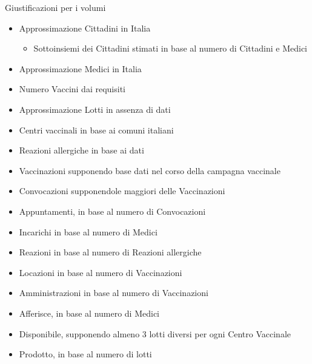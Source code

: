 \documentclass[11pt]{article}
\begin{document}
Giustificazioni per i volumi
\begin{itemize}
\item Approssimazione Cittadini in Italia
\begin{itemize}
\item Sottoinsiemi dei Cittadini stimati in base al numero di Cittadini e Medici
\end{itemize}
\item Approssimazione Medici in Italia
\item Numero Vaccini dai requisiti
\item Approssimazione Lotti in assenza di dati
\item Centri vaccinali in base ai comuni italiani
\item Reazioni allergiche in base ai dati
\item Vaccinazioni supponendo base dati nel corso della campagna vaccinale
\item Convocazioni supponendole maggiori delle Vaccinazioni
\item Appuntamenti, in base al numero di Convocazioni
\item Incarichi in base al numero di Medici
\item Reazioni in base al numero di Reazioni allergiche
\item Locazioni in base al numero di Vaccinazioni
\item Amministrazioni in base al numero di Vaccinazioni
\item Afferisce, in base al numero di Medici
\item Disponibile, supponendo almeno 3 lotti diversi per ogni Centro Vaccinale
\item Prodotto, in base al numero di lotti
\end{itemize}
\end{document}

